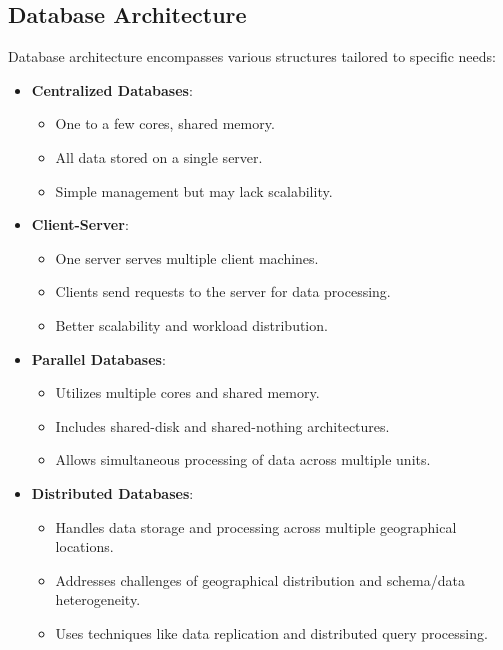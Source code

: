 \documentclass{article}
\begin{document}
\subsection*{Database Architecture}

Database architecture encompasses various structures tailored to specific needs:

\begin{itemize}
    \item \textbf{Centralized Databases}:
    \begin{itemize}
        \item One to a few cores, shared memory.
        \item All data stored on a single server.
        \item Simple management but may lack scalability.
    \end{itemize}
    
    \item \textbf{Client-Server}:
    \begin{itemize}
        \item One server serves multiple client machines.
        \item Clients send requests to the server for data processing.
        \item Better scalability and workload distribution.
    \end{itemize}
    
    \item \textbf{Parallel Databases}:
    \begin{itemize}
        \item Utilizes multiple cores and shared memory.
        \item Includes shared-disk and shared-nothing architectures.
        \item Allows simultaneous processing of data across multiple units.
    \end{itemize}
    
    \item \textbf{Distributed Databases}:
    \begin{itemize}
        \item Handles data storage and processing across multiple geographical locations.
        \item Addresses challenges of geographical distribution and schema/data heterogeneity.
        \item Uses techniques like data replication and distributed query processing.
    \end{itemize}
\end{itemize}
\end{document}
